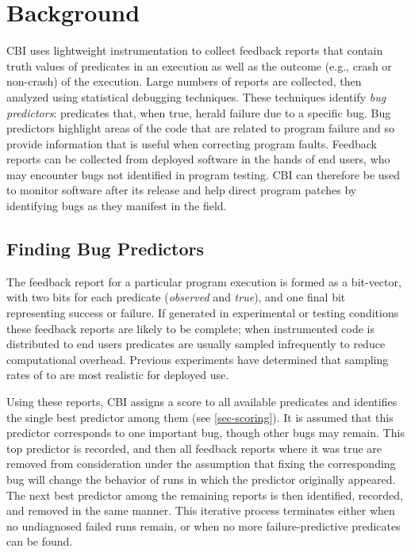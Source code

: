 
\section{Background}
\label{sec-background}
CBI uses lightweight instrumentation to collect feedback reports that contain truth values of predicates in an execution as well as the outcome (e.g., crash or non-crash) of the execution.  Large numbers of reports are collected, then analyzed using statistical debugging techniques.  These techniques identify \emph{bug predictors}: predicates that, when true, herald failure due to a specific bug.  Bug predictors highlight areas of the code that are related to program failure and so provide information that is useful when correcting program faults.  Feedback reports can be collected from deployed software in the hands of end users, who may encounter bugs not identified in program testing.  CBI can therefore be used to monitor software after its release and help direct program patches by identifying bugs as they manifest in the field.

\subsection{Finding Bug Predictors}
\label{sec-elimalg}
The feedback report for a particular program execution is formed as a bit-vector, with two bits for each predicate (\emph{observed} and \emph{true}), and one final bit representing success or failure.  If generated in experimental or testing conditions these feedback reports are likely to be complete; when instrumented code is distributed to end users predicates are usually sampled infrequently to reduce computational overhead.  Previous experiments \cite{Liblit:2003:BIRPS} have determined that sampling rates of  to  are most realistic for deployed use.

Using these reports, CBI assigns a score to all available predicates and identifies the single best predictor among them (see \autoref{sec-scoring}).  It is assumed that this predictor corresponds to one important bug, though other bugs may remain.    This top predictor is recorded, and then all feedback reports where it was true are removed from consideration under the assumption that fixing the corresponding bug will change the behavior of runs in which the predictor originally appeared.  The next best predictor among the remaining reports is then identified, recorded, and removed in the same manner.  This iterative process terminates either when no undiagnosed failed runs remain, or when no more failure-predictive predicates can be found.

